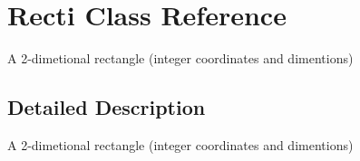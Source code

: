 \hypertarget{class_recti}{\section{Recti Class Reference}
\label{class_recti}
}


A 2-\/dimetional rectangle (integer coordinates and dimentions)  




\subsection{Detailed Description}
A 2-\/dimetional rectangle (integer coordinates and dimentions) 